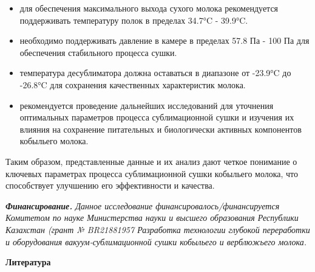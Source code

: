 \begin{itemize}
\item
  для обеспечения максимального выхода сухого молока рекомендуется
  поддерживать температуру полок в пределах 34.7°C - 39.9°C.
\item
  необходимо поддерживать давление в камере в пределах 57.8 Па - 100 Па
  для обеспечения стабильного процесса сушки.
\item
  температура десублиматора должна оставаться в диапазоне от -23.9°C до
  -26.8°C для сохранения качественных характеристик молока.
\item
  рекомендуется проведение дальнейших исследований для уточнения
  оптимальных параметров процесса сублимационной сушки и изучения их
  влияния на сохранение питательных и биологически активных компонентов
  кобыльего молока.
\end{itemize}

Таким образом, представленные данные и их анализ дают четкое понимание о
ключевых параметрах процесса сублимационной сушки кобыльего молока, что
способствует улучшению его эффективности и качества.

\emph{{\bfseries Финансирование.} Данное исследование
финансировалось/финансируется Комитетом по науке Министерства науки и
высшего образования Республики Казахстан (грант № BR21881957 Разработка
технологии глубокой переработки и оборудования вакуум-сублимационной
сушки кобыльего и верблюжьего молока.}


\begin{center}
  {\bfseries Литература}
  \end{center}


